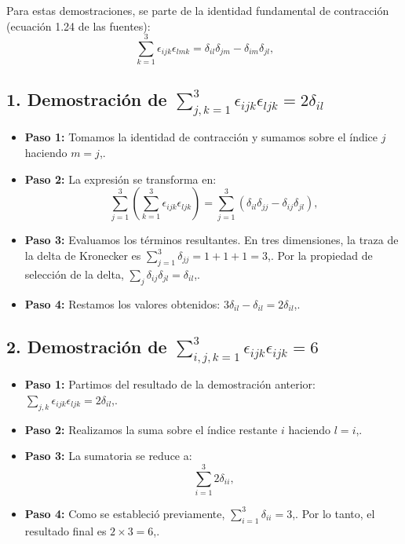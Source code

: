 \documentclass[a4paper]{article}
\begin{document}
Para estas demostraciones, se parte de la identidad fundamental de contracción (ecuación 1.24 de las fuentes):
\begin{equation}
    \sum_{k=1}^{3} \epsilon_{ijk} \epsilon_{lmk} = \delta_{il}\delta_{jm} - \delta_{im}\delta_{jl} \text{,}
\end{equation}

\subsection*{1. Demostración de $\sum_{j,k=1}^3 \epsilon_{ijk} \epsilon_{ljk} = 2\delta_{il}$}
\begin{itemize}
    \item \textbf{Paso 1:} Tomamos la identidad de contracción y sumamos sobre el índice $j$ haciendo $m = j$,.
    \item \textbf{Paso 2:} La expresión se transforma en:
    \begin{equation}
        \sum_{j=1}^{3} \left( \sum_{k=1}^{3} \epsilon_{ijk} \epsilon_{ljk} \right) = \sum_{j=1}^{3} (\delta_{il}\delta_{jj} - \delta_{ij}\delta_{jl}) \text{,}
    \end{equation}
    \item \textbf{Paso 3:} Evaluamos los términos resultantes. En tres dimensiones, la traza de la delta de Kronecker es $\sum_{j=1}^3 \delta_{jj} = 1 + 1 + 1 = 3$,. Por la propiedad de selección de la delta, $\sum_j \delta_{ij}\delta_{jl} = \delta_{il}$,.
    \item \textbf{Paso 4:} Restamos los valores obtenidos: $3\delta_{il} - \delta_{il} = 2\delta_{il}$,.
\end{itemize}

\subsection*{2. Demostración de $\sum_{i,j,k=1}^3 \epsilon_{ijk} \epsilon_{ijk} = 6$}
\begin{itemize}
    \item \textbf{Paso 1:} Partimos del resultado de la demostración anterior: $\sum_{j,k} \epsilon_{ijk} \epsilon_{ljk} = 2\delta_{il}$,.
    \item \textbf{Paso 2:} Realizamos la suma sobre el índice restante $i$ haciendo $l = i$,.
    \item \textbf{Paso 3:} La sumatoria se reduce a:
    \begin{equation}
        \sum_{i=1}^{3} 2\delta_{ii} \text{,}
    \end{equation}
    \item \textbf{Paso 4:} Como se estableció previamente, $\sum_{i=1}^3 \delta_{ii} = 3$,. Por lo tanto, el resultado final es $2 \times 3 = 6$,.
\end{itemize}
\end{document}
